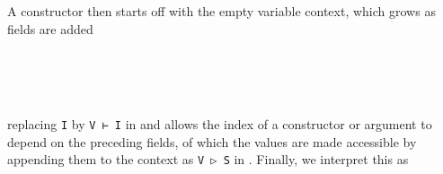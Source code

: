 A constructor then starts off with the empty variable context, which grows as fields are added
\begin{code}%
%
\>[2]\AgdaSpace{}%
\AgdaSpace{}%
\AgdaSpace{}%
\AgdaSpace{}%
\AgdaSpace{}%
\<%
\\
\>[2][@{}l@{\AgdaIndent{0}}]%
\>[4]%
\>[8]\AgdaSymbol{:}\AgdaSpace{}%
\AgdaSpace{}%
\AgdaSpace{}%
\AgdaSpace{}%
\AgdaSpace{}%
\AgdaSpace{}%
\AgdaSpace{}%
\AgdaSpace{}%
\<%
\\
%
\>[4]%
\>[8]\AgdaSymbol{:}\AgdaSpace{}%
\AgdaSpace{}%
\AgdaSpace{}%
\AgdaSpace{}%
\AgdaSpace{}%
\AgdaSpace{}%
\AgdaSpace{}%
\AgdaSpace{}%
\AgdaSpace{}%
\AgdaSpace{}%
\AgdaSpace{}%
\AgdaSpace{}%
\AgdaSpace{}%
\<%
\\
%
\>[4]%
\>[8]\AgdaSymbol{:}\AgdaSpace{}%
\AgdaSymbol{(}\AgdaSpace{}%
\AgdaSymbol{:}\AgdaSpace{}%
\AgdaSpace{}%
\AgdaSpace{}%
\AgdaSymbol{)}\AgdaSpace{}%
\AgdaSpace{}%
\AgdaSpace{}%
\AgdaSpace{}%
\AgdaSymbol{(}\AgdaSpace{}%
\AgdaSpace{}%
\AgdaSymbol{)}\AgdaSpace{}%
\AgdaSpace{}%
\AgdaSpace{}%
\AgdaSpace{}%
\AgdaSpace{}%
\AgdaSpace{}%
\<%
\end{code}
replacing \texttt{I} by \texttt{V ⊢ I} in  and  allows the index of a constructor or argument to depend on the preceding fields, of which the values are made accessible by appending them to the context as \texttt{V ▷ S} in . Finally, we interpret this as
